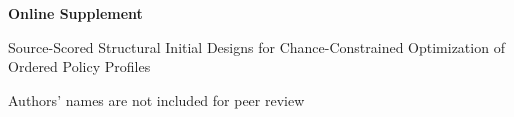 \documentclass[opre,dblanonrev]{informs4}
\begin{document}
\ECSwitch
\raggedbottom

\begin{center}
{\Large\bfseries Online Supplement}\par
\vspace{0.6em}
{\large Source-Scored Structural Initial Designs for Chance-Constrained
Optimization of Ordered Policy Profiles}\par
\vspace{0.4em}
Authors' names are not included for peer review
\end{center}





\end{document}
